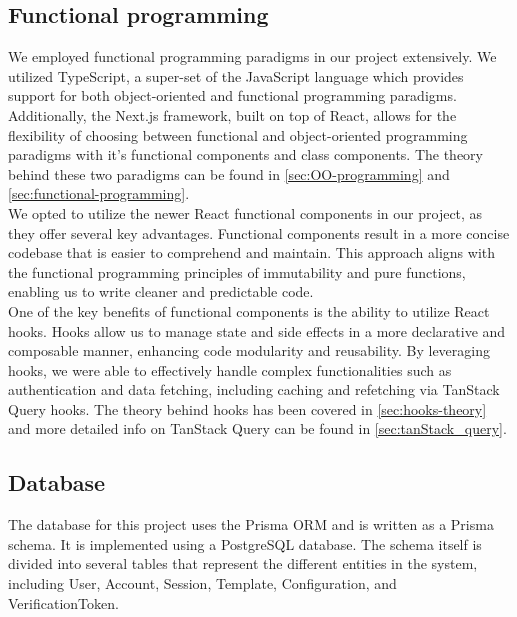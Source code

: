 \newpage

\subsection{Functional programming}

We employed functional programming paradigms in our project extensively. We utilized TypeScript, a super-set of the JavaScript language which provides support for both object-oriented and functional programming paradigms. Additionally, the Next.js framework, built on top of React, allows for the flexibility of choosing between functional and object-oriented programming paradigms with it's functional components and class components. The theory behind these two paradigms can be found in \autoref{sec:OO-programming} and \autoref{sec:functional-programming}. \\

\noindent
We opted to utilize the newer React functional components in our project, as they offer several key advantages. Functional components result in a more concise codebase that is easier to comprehend and maintain. This approach aligns with the functional programming principles of immutability and pure functions, enabling us to write cleaner and predictable code. \\

\noindent
One of the key benefits of functional components is the ability to utilize React hooks. Hooks allow us to manage state and side effects in a more declarative and composable manner, enhancing code modularity and reusability. By leveraging hooks, we were able to effectively handle complex functionalities such as authentication and data fetching, including caching and refetching via TanStack Query hooks. The theory behind hooks has been covered in \autoref{sec:hooks-theory} and more detailed info on TanStack Query can be found in \autoref{sec:tanStack_query}. \\


\newpage

\subsection{Database}
\label{chap:database-schema}

The database for this project uses the Prisma ORM and is written as a Prisma schema. It is implemented using a PostgreSQL database. The schema itself is divided into several tables that represent the different entities in the system, including User, Account, Session, Template, Configuration, and VerificationToken. \\

